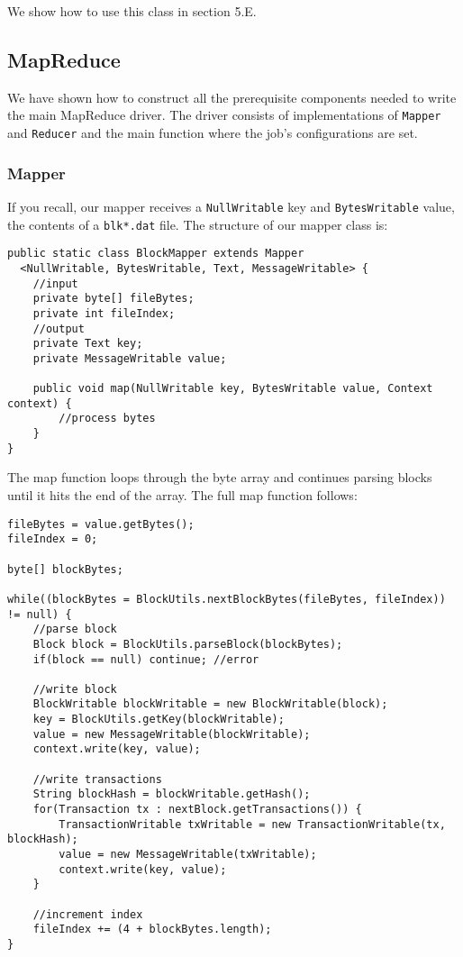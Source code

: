 \documentclass[9pt,twocolumn,twoside]{idsi}
\begin{document}
We show how to use this class in section 5.E.

\subsection{MapReduce}
We have shown how to construct all the prerequisite components needed to write the main MapReduce driver. The driver consists of implementations of \lstinline{Mapper} and \lstinline{Reducer} and the main function where the job's configurations are set.

\subsubsection{Mapper}
If you recall, our mapper receives a \lstinline{NullWritable} key and \lstinline{BytesWritable} value, the contents of a \lstinline{blk*.dat} file. The structure of our mapper class is:
\begin{lstlisting}
public static class BlockMapper extends Mapper
  <NullWritable, BytesWritable, Text, MessageWritable> {
    //input
    private byte[] fileBytes;
    private int fileIndex;
    //output
    private Text key;
    private MessageWritable value;

    public void map(NullWritable key, BytesWritable value, Context context) {
        //process bytes
    }
}
\end{lstlisting}
The map function loops through the byte array and continues parsing blocks until it hits the end of the array. The full map function follows:

\begin{lstlisting}
fileBytes = value.getBytes();
fileIndex = 0;

byte[] blockBytes;

while((blockBytes = BlockUtils.nextBlockBytes(fileBytes, fileIndex)) != null) {
    //parse block
    Block block = BlockUtils.parseBlock(blockBytes);
    if(block == null) continue; //error

    //write block
    BlockWritable blockWritable = new BlockWritable(block);
    key = BlockUtils.getKey(blockWritable);
    value = new MessageWritable(blockWritable);
    context.write(key, value);

    //write transactions
    String blockHash = blockWritable.getHash();
    for(Transaction tx : nextBlock.getTransactions()) {
        TransactionWritable txWritable = new TransactionWritable(tx, blockHash);
        value = new MessageWritable(txWritable);
        context.write(key, value);
    }

    //increment index
    fileIndex += (4 + blockBytes.length);
}
\end{lstlisting}
\end{document}
